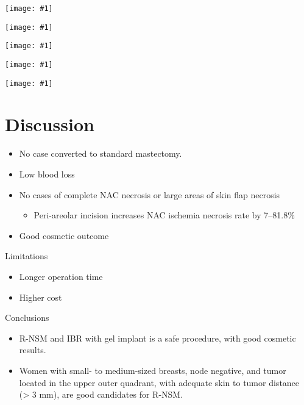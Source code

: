 \documentclass{beamer}
\newcommand*{\solo}[1]{\centering\texttt{[image: \#1]}}
\begin{document}
\begin{frame}
    \solo{T1e.eps}
\end{frame}

\begin{frame}
    \solo{T1f.eps}
\end{frame}

\begin{frame}
    \solo{T2a.eps}
\end{frame}

\begin{frame}
    \solo{T2b.eps}
\end{frame}

\begin{frame}
    \solo{T3.eps}
\end{frame}

\section{Discussion}
\begin{frame}
    \begin{itemize}
        \item No case converted to standard mastectomy.
        \item Low blood loss
        \item No cases of complete NAC necrosis or large areas of skin flap necrosis
            \begin{itemize}
                \item Peri-areolar incision increases NAC ischemia necrosis rate by 7--81.8\%
            \end{itemize}
        \item Good cosmetic outcome
    \end{itemize}
\end{frame}

\begin{frame}{Limitations}
    \begin{itemize}
        \item Longer operation time
        \item Higher cost
    \end{itemize}
\end{frame}

\begin{frame}{Conclusions}
    \begin{itemize}
        \item R-NSM and IBR with gel implant is a safe procedure, with good cosmetic results.
        \item Women with small- to medium-sized breasts, node negative, and
              tumor located in the upper outer quadrant, with adequate skin to
              tumor distance (> 3 mm), are good candidates for R-NSM.
    \end{itemize}
\end{frame}
\end{document}
